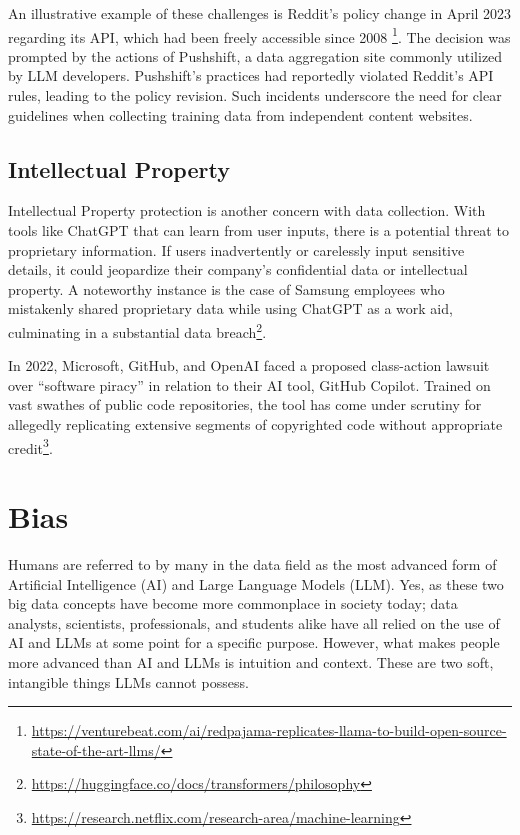 \documentclass[
]{book}
\begin{document}
An illustrative example of these challenges is Reddit's policy change in April 2023 regarding its API, which had been freely accessible since 2008 \footnote{\url{https://venturebeat.com/ai/redpajama-replicates-llama-to-build-open-source-state-of-the-art-llms/}}. The decision was prompted by the actions of Pushshift, a data aggregation site commonly utilized by LLM developers. Pushshift's practices had reportedly violated Reddit's API rules, leading to the policy revision. Such incidents underscore the need for clear guidelines when collecting training data from independent content websites.

\hypertarget{intellectual-property}{%
\section{Intellectual Property}\label{intellectual-property}}

Intellectual Property protection is another concern with data collection. With tools like ChatGPT that can learn from user inputs, there is a potential threat to proprietary information. If users inadvertently or carelessly input sensitive details, it could jeopardize their company's confidential data or intellectual property. A noteworthy instance is the case of Samsung employees who mistakenly shared proprietary data while using ChatGPT as a work aid, culminating in a substantial data breach\footnote{\url{https://huggingface.co/docs/transformers/philosophy}}.

In 2022, Microsoft, GitHub, and OpenAI faced a proposed class-action lawsuit over ``software piracy'' in relation to their AI tool, GitHub Copilot. Trained on vast swathes of public code repositories, the tool has come under scrutiny for allegedly replicating extensive segments of copyrighted code without appropriate credit\footnote{\url{https://research.netflix.com/research-area/machine-learning}}.

\hypertarget{bias}{%
\chapter{Bias}\label{bias}}

Humans are referred to by many in the data field as the most advanced form of Artificial Intelligence (AI) and Large Language Models (LLM). Yes, as these two big data concepts have become more commonplace in society today; data analysts, scientists, professionals, and students alike have all relied on the use of AI and LLMs at some point for a specific purpose. However, what makes people more advanced than AI and LLMs is intuition and context. These are two soft, intangible things LLMs cannot possess.
\end{document}
